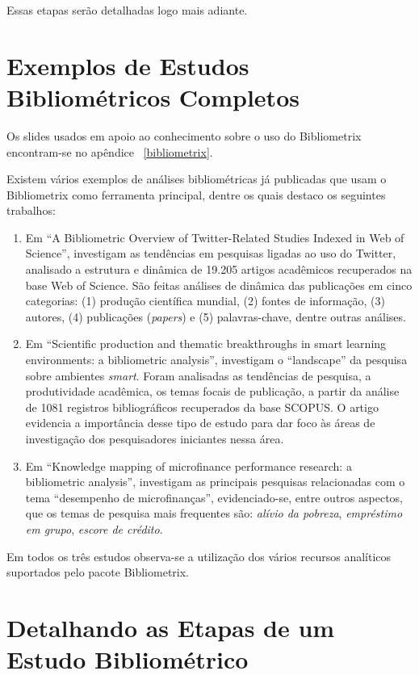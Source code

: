 Essas etapas serão detalhadas logo mais adiante.

\section{Exemplos de Estudos Bibliométricos Completos}

Os slides usados em apoio ao conhecimento sobre o uso do Bibliometrix encontram-se no apêndice ~\ref{bibliometrix}.

Existem vários exemplos de análises bibliométricas já publicadas que usam o Bibliometrix como ferramenta principal, dentre os quais destaco os seguintes trabalhos:
\begin{enumerate}
    \item Em ``A Bibliometric Overview of Twitter-Related Studies Indexed in Web of Science'', \cite{yu_bibliometric_2020} investigam as tendências em pesquisas ligadas ao uso do Twitter, analisado a estrutura e dinâmica de 19.205 artigos acadêmicos recuperados na base Web of Science. São feitas análises de dinâmica das publicações em cinco categorias: (1) produção científica mundial, (2) fontes de informação, (3) autores, (4) publicações (\textit{papers}) e (5) palavras-chave, dentre outras análises.
    \item Em ``Scientific production and thematic breakthroughs in smart learning environments: a bibliometric analysis'', \cite{agbo_scientific_2021} investigam o ``landscape'' da pesquisa sobre ambientes \textit{smart}. Foram analisadas as tendências de pesquisa, a produtividade acadêmica, os temas focais de publicação, a partir da análise de 1081 registros bibliográficos recuperados da base SCOPUS. O artigo evidencia a importância desse tipo de estudo para dar foco às áreas de investigação dos pesquisadores iniciantes nessa área.
    \item Em ``Knowledge mapping of microfinance performance research: a bibliometric analysis'', \cite{akter_knowledge_2021} investigam as principais pesquisas relacionadas com o tema  ``desempenho de microfinanças'', evidenciado-se, entre outros aspectos, que os temas de pesquisa mais frequentes são: \textit{alívio da pobreza}, \textit{empréstimo em grupo}, \textit{escore de crédito}.
\end{enumerate}

Em todos os três estudos observa-se a utilização dos vários recursos analíticos suportados pelo pacote Bibliometrix.

\section{Detalhando as Etapas de um Estudo Bibliométrico}


